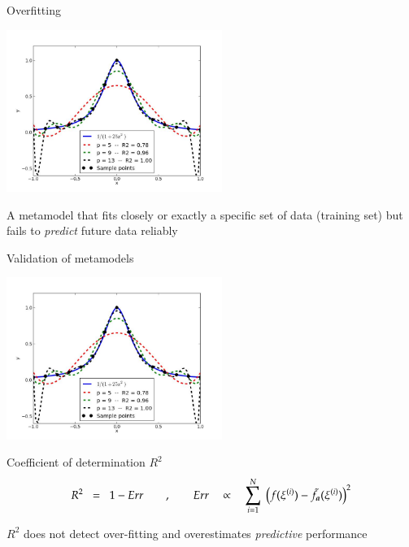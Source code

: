 \documentclass[9pt]{beamer}
\begin{document}
\begin{frame}[t]{Overfitting}

\begin{center}
 \includegraphics[width=7cm]{../Pics/runge-func-ols.jpeg} \\
\end{center}

\vfill 
\begin{center}
A metamodel that fits closely or exactly a specific set of data (training set) but fails to \emph{predict} future data reliably
\end{center}

\end{frame}

\begin{frame}[t]{Validation of metamodels}

\begin{center}
 \includegraphics[width=7cm]{../Pics/runge-func-ols.jpeg} \\
\end{center}

\vfill 
Coefficient of determination $R^2$
$$  R^2 \; \; = \; \; 1 - Err \qquad , \qquad Err \quad \propto \quad \sum_{i=1}^N \; \left( f(\xi^{(i)}) - \tilde{f}_{\boldsymbol a}(\xi^{(i)})  \right)^2  $$

\begin{center}
	$R^2$ does not detect over-fitting and overestimates \emph{predictive} performance
\end{center}

\end{frame}
\end{document}
